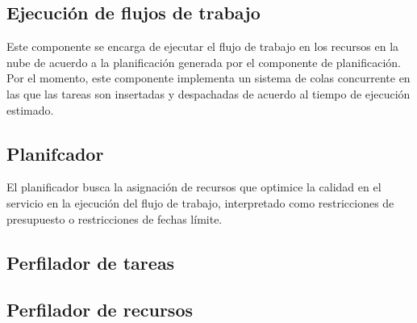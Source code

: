 \subsection{Ejecución de flujos de trabajo}

Este componente se encarga de ejecutar el flujo de trabajo en los recursos en la nube de acuerdo a la planificación generada por el componente de planificación. Por el momento, este componente implementa un sistema de colas concurrente en las que las tareas son insertadas y despachadas de acuerdo al tiempo de ejecución estimado.



\subsection{Planifcador}

El planificador busca la asignación de recursos que optimice la calidad en el servicio en la ejecución del flujo de trabajo, interpretado como restricciones de presupuesto o restricciones de fechas límite. 



\subsection{Perfilador de tareas}



\subsection{Perfilador de recursos}
